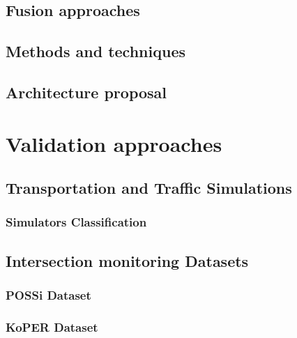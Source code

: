 \subsection{Fusion approaches}
\subsection{Methods and techniques}
\subsection{Architecture proposal}
\section{Validation approaches}
\subsection{Transportation and Traffic Simulations}
\subsubsection{Simulators Classification}
\subsection{Intersection monitoring Datasets}
\subsubsection{POSSi Dataset}
\subsubsection{KoPER Dataset}